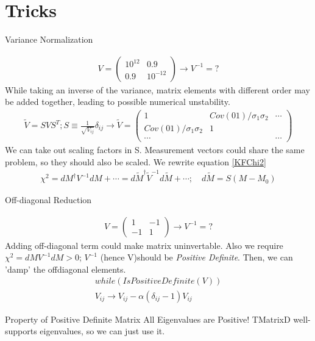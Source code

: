 \documentclass[
	xcolor=dvipsnames,
	aspectratio=169,	
	10pt, 
	]{beamer}
\begin{document}
\section{Tricks}
\begin{frame}{Variance Normalization}
	\begin{block}{}
		\begin{align}
			V =
			 \begin{pmatrix}
				10^{12}&0.9\\
				0.9&10^{-12}
			\end{pmatrix}\to V^{-1} = ?
		\end{align}
		While taking an inverse of the variance, matrix elements with different order may be added together, leading to possible numerical unstability. 
		\begin{align}
			\tilde V = S V S^T; S\equiv 
				\frac{1}{\sqrt{V_{ij}}}\delta_{ij}\to \tilde V=\begin{pmatrix}
					1 & Cov(01)/\sigma_{1}\sigma_{2}&\cdots \\
					Cov(01)/\sigma_{1}\sigma_{2}& 1& \\
					\cdots&&\cdots
				\end{pmatrix}
		\end{align}
		We can take out scaling factors in S. Measurement vectors could share the same problem, so they should also be scaled. We rewrite equation \eqref{KFChi2}
		\begin{align}
			\chi^2 = dM^\dagger V^{-1} dM +\cdots= d\tilde M^\dagger \tilde V^{-1}d\tilde M+\cdots;\quad d \tilde M = S(M-M_0) 
		\end{align}
	\end{block}
\end{frame}
\begin{frame}{Off-diagonal Reduction}
	\begin{block}{}
		\begin{align}{}
			V = \begin{pmatrix}
					1&-1\\
					-1&1
			\end{pmatrix}\to V^{-1} = ?
		\end{align}
		Adding off-diagonal term could make matrix uninvertable.  Also we require $\chi^2 = dM V^{-1} dM >0$; $V^{-1}$ (hence V)should be \textit{Positive Definite}. 
		Then, we can 'damp' the offdiagonal elements.
		\begin{align}
			while(IsPositiveDefinite(V))\\
			V_{ij} \to V_{ij}  - \alpha (\delta_{ij}-1) V_{ij}
		\end{align}
		\begin{block}{Property of Positive Definite Matrix}
			All Eigenvalues are Positive! TMatrixD well-supports eigenvalues, so we can just use it.
		\end{block}
	\end{block}
\end{frame}
\end{document}
